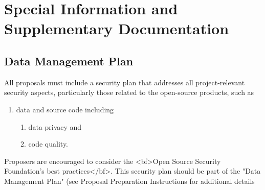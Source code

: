 \section*{Special Information and Supplementary Documentation}

\subsection*{Data Management Plan}

All proposals must include a security plan that addresses all project-relevant security aspects, particularly those related to the open-source products, such as
\begin{enumerate}
    \item data and source code including
\begin{enumerate}
    \item data privacy and
    \item code quality.
\end{enumerate}   
\end{enumerate}

Proposers are encouraged to consider the <bf>Open Source Security Foundation’s best practices</bf>. This security plan should be part of the "Data Management Plan" (see Proposal Preparation Instructions for additional details